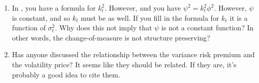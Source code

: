 \documentclass[11pt, letterpaper, twoside, final]{article}
\begin{document}
    \begin{enumerate}
        \item In \textcite[6]{khrapov2016affine}, you have a formula for $k_t^2$. However, and you have $\psi^2 =
            k_t^2 \phi^2$. However, $\psi$ is constant, and so $k_t$ must be as well. If you fill in the formula
            for $k_t$ it is a function of $\sigma^2_t$. Why does this not imply that $\psi$ is not a constant
            function? In other words, the change-of-measure is not structure preserving?
        \item Has anyone discussed the relationship between the variance risk premium and the volatility price? It
            seems like they should be related. If they are, it's probably a good idea to cite them.
    \end{enumerate}
\end{document}
